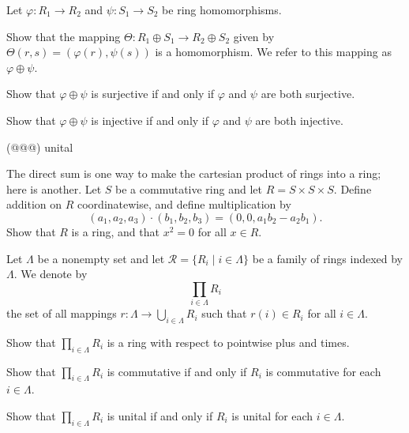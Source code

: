 \begin{exercise}
Let \(\varphi : R_1 \rightarrow R_2\) and \(\psi : S_1 \rightarrow S_2\) be ring homomorphisms.
\begin{proplist}
\item Show that the mapping \(\Theta : R_1 \oplus S_1 \rightarrow R_2 \oplus S_2\) given by \(\Theta(r,s) = (\varphi(r), \psi(s))\) is a homomorphism.
We refer to this mapping as \(\varphi \oplus \psi\).
\item Show that \(\varphi \oplus \psi\) is surjective if and only if $\varphi$ and $\psi$ are both surjective.
\item Show that \(\varphi \oplus \psi\) is injective if and only if $\varphi$ and $\psi$ are both injective.
\item (@@@) unital
\end{proplist}
\end{exercise}


\begin{exercise}
The direct sum is one way to make the cartesian product of rings into a ring; here is another.
Let \(S\) be a commutative ring and let \(R = S \times S \times S\).
Define addition on \(R\) coordinatewise, and define multiplication by \[ (a_1,a_2,a_3) \cdot (b_1,b_2,b_3) = (0,0,a_1b_2 - a_2b_1). \]
Show that \(R\) is a ring, and that \(x^2 = 0\) for all \(x \in R\).
\end{exercise}


\begin{exercise} \label{exerc:direct-product}
Let \(\Lambda\) be a nonempty set and let \(\mathcal{R} = \{ R_i \mid i \in \Lambda \}\) be a family of rings indexed by \(\Lambda\).
We denote by \[ \prod_{i \in \Lambda} R_i \] the set of all mappings \(r : \Lambda \rightarrow \bigcup_{i \in \Lambda} R_i\) such that \(r(i) \in R_i\) for all \(i \in \Lambda\).
\begin{proplist}
\item Show that \(\prod_{i \in \Lambda} R_i\) is a ring with respect to pointwise plus and times.
\item Show that \(\prod_{i \in \Lambda} R_i\) is commutative if and only if \(R_i\) is commutative for each \(i \in \Lambda\).
\item Show that \(\prod_{i \in \Lambda} R_i\) is unital if and only if \(R_i\) is unital for each \(i \in \Lambda\).
\end{proplist}
\end{exercise}


